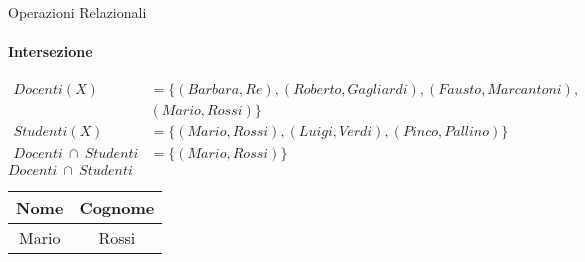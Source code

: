     \begin{frame}{Operazioni Relazionali}
        \framesubtitle{Intersezione}
        \vspace{-1cm}
        \begin{align*}Docenti(X) &= \{(Barbara,Re),(Roberto,Gagliardi),(Fausto,Marcantoni),\\&(Mario,Rossi)\}\\
        Studenti(X) &= \{(Mario,Rossi),(Luigi,Verdi),(Pinco,Pallino)\}\\
        Docenti~\cap~Studenti &= \{(Mario,Rossi)\}
        \end{align*}
        \centering
        $Docenti~\cap~Studenti$\\
        \begin{tabular}{|c|c|}
            \hline
            \rowcolor{cyan!30}Nome & Cognome \\
            \hline
            Mario & Rossi \\ \hline
        \end{tabular}
    \end{frame}

